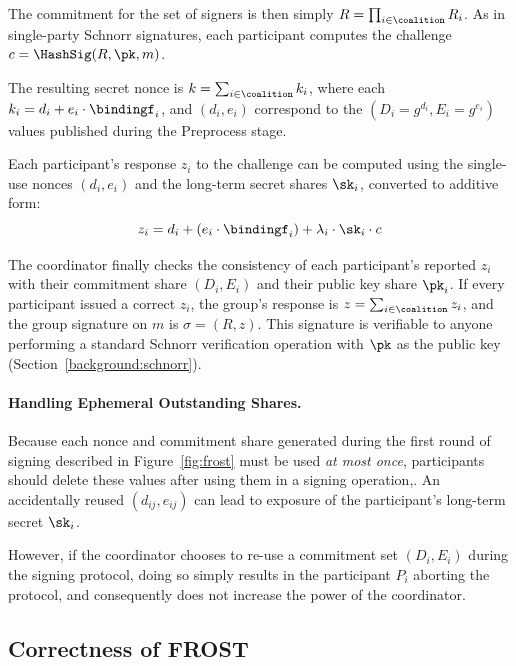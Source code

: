 The commitment for the set of signers
is then simply $R = \prod_{i \in \coalition} R_i$.
As in single-party Schnorr signatures, each participant computes the challenge
$c = \HashSig(R, \pk, m)$.

The resulting secret nonce is
$k = \sum_{i \in \coalition} k_i$, where each $k_i = d_i + e_i \cdot \bindingf_i$,
and $(d_i, e_i)$ correspond to the $(D_i = g^{d_i},
E_i=g^{e_i})$ values published during the Preprocess stage.

Each participant's response $z_i$ to the challenge
can be computed using the single-use nonces $(d_i, e_i)$ and the
long-term secret shares $\sk_i$, converted to additive form:
\[
  z_i = d_i + (e_i \cdot \bindingf_i) + \lambda_i \cdot \sk_i \cdot c
\]

The coordinator finally checks the consistency of each participant's reported
$z_i$ with their commitment share $(D_i, E_i)$ and their public key share
$\pk_i$.
If every participant issued a correct $z_i$, the group's response is
$z = \sum_{i \in \coalition} z_i$, and the group signature on $m$ is $\sigma=(R, z)$.
This signature is
verifiable to anyone performing a standard Schnorr verification operation
with $\pk$ as the public key (Section~\ref{background:schnorr}).



\paragraph{Handling Ephemeral Outstanding Shares.} Because each nonce and
commitment share generated during the first round of signing described in Figure~\ref{fig:frost}
must be used \emph{at most once},
participants should delete these values after using them in a signing operation,.
An accidentally reused $(d_{ij}, e_{ij})$ can lead to exposure of the participant's
long-term secret $\sk_i$.

However, if the coordinator chooses to re-use a commitment set $(D_i,
E_i)$ during the signing protocol,  doing so simply results in
the participant $P_i$ aborting the protocol, and consequently does not increase the power of the coordinator.

\subsection{Correctness of FROST}
\label{frost:correctness}

